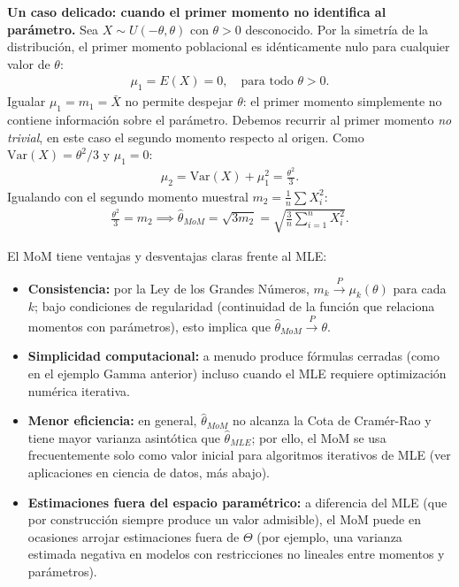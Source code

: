 \begin{ejemplo}
	\textbf{Un caso delicado: cuando el primer momento no identifica al parámetro.}
	Sea $X \sim U(-\theta, \theta)$ con $\theta > 0$ desconocido. Por la simetría de la distribución, el primer momento poblacional es idénticamente nulo para cualquier valor de $\theta$:
	\begin{align}
		\mu_1 = E(X) = 0, \quad \text{para todo } \theta > 0.
	\end{align}
	Igualar $\mu_1 = m_1 = \bar{X}$ no permite despejar $\theta$: el primer momento simplemente no contiene información sobre el parámetro. Debemos recurrir al primer momento \emph{no trivial}, en este caso el segundo momento respecto al origen. Como $\text{Var}(X) = \theta^2/3$ y $\mu_1 = 0$:
	\begin{align}
		\mu_2 = \text{Var}(X) + \mu_1^2 = \frac{\theta^2}{3}.
	\end{align}
	Igualando con el segundo momento muestral $m_2 = \frac{1}{n}\sum X_i^2$:
	\begin{align}
		\frac{\theta^2}{3} = m_2 \implies \hat{\theta}_{MoM} = \sqrt{3 m_2} = \sqrt{\frac{3}{n}\sum_{i=1}^n X_i^2}.
	\end{align}
\end{ejemplo}

\begin{observacion}
	El MoM tiene ventajas y desventajas claras frente al MLE:
	\begin{itemize}
		\item \textbf{Consistencia:} por la Ley de los Grandes Números, $m_k \xrightarrow{P} \mu_k(\theta)$ para cada $k$; bajo condiciones de regularidad (continuidad de la función que relaciona momentos con parámetros), esto implica que $\hat{\theta}_{MoM} \xrightarrow{P} \theta$.
		\item \textbf{Simplicidad computacional:} a menudo produce fórmulas cerradas (como en el ejemplo Gamma anterior) incluso cuando el MLE requiere optimización numérica iterativa.
		\item \textbf{Menor eficiencia:} en general, $\hat{\theta}_{MoM}$ no alcanza la Cota de Cramér-Rao y tiene mayor varianza asintótica que $\hat{\theta}_{MLE}$; por ello, el MoM se usa frecuentemente solo como valor inicial para algoritmos iterativos de MLE (ver aplicaciones en ciencia de datos, más abajo).
		\item \textbf{Estimaciones fuera del espacio paramétrico:} a diferencia del MLE (que por construcción siempre produce un valor admisible), el MoM puede en ocasiones arrojar estimaciones fuera de $\Theta$ (por ejemplo, una varianza estimada negativa en modelos con restricciones no lineales entre momentos y parámetros).
	\end{itemize}
\end{observacion}

